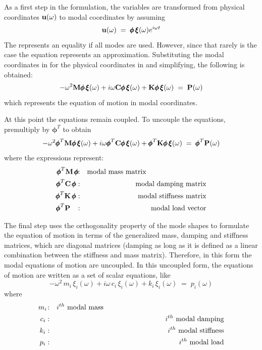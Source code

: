 As a first step in the formulation, the variables are transformed from physical
coordinates ${\bf u}(\omega)$ to modal coordinates by assuming
%
\begin{equation}
\label{eq:fra6}
{\bf u}(\omega) \;=\; {\pmb\phi}\,{\pmb\xi}(\omega)e^{i\omega t}
\end{equation}
%
The  represents an equality if all modes are used.
However, since that rarely is the case the equation represents an approximation.
Substituting the modal coordinates in  for the physical
coordinates in  and simplifying, the following is obtained:
%
\begin{equation}
\label{eq:fra8}
-\omega^2{\bf M}{\pmb\phi}\,{\pmb\xi}(\omega) +
i\omega  {\bf C}{\pmb\phi}\,{\pmb\xi}(\omega) +
         {\bf K}{\pmb\phi}\,{\pmb\xi}(\omega) \;=\; {\bf P}(\omega)
\end{equation}
%
which represents the equation of motion in modal coordinates.

At this point the equations remain coupled.
To uncouple the equations, premultiply by ${\pmb\phi}^T$ to obtain
%
\begin{equation}
\label{eq:fra9}
-\omega^2{\pmb\phi}^T{\bf M}{\pmb\phi}\,{\pmb\xi}(\omega) +
  i\omega{\pmb\phi}^T{\bf C}{\pmb\phi}\,{\pmb\xi}(\omega) +
         {\pmb\phi}^T{\bf K}{\pmb\phi}\,{\pmb\xi}(\omega) \;=\;
         {\pmb\phi}^T{\bf P}(\omega)
\end{equation}
%
where the expressions represent:
%
\begin{eqnarray*}
{\pmb\phi}^T{\mf M}\,{\pmb\phi}\!\! &:& \mbox{modal mass matrix\hskip3cm} \\
{\pmb\phi}^T{\mf C}\,{\pmb\phi} &:& \mbox{modal damping matrix} \\
{\pmb\phi}^T{\mf K}\,{\pmb\phi} &:& \mbox{modal stiffness matrix} \\
{\pmb\phi}^T{\mf P}\;\;\;       &:& \mbox{modal load vector}
\end{eqnarray*}

The final step uses the orthogonality property of the mode shapes to
formulate the equation of motion in terms of the generalized mass, damping and
stiffness matrices, which are diagonal matrices (damping as long as it is
defined as a linear combination between the stiffness and mass matrix).
Therefore, in this form the modal equations of motion are uncoupled.
In this uncoupled form, the equations of motion are written as a set of
scalar equations, like
%
\begin{equation}
\label{eq:fra10}
-\omega^2\,m_i\,{\xi_i}(\omega) +
i\omega  \,c_i\,{\xi_i}(\omega) +
           k_i\,{\xi_i}(\omega) \;=\; p_i(\omega)
\end{equation}
%
where
%
\begin{eqnarray*}
m_i\! &:& i^{th}\mbox{ modal mass\hskip6cm} \\
c_i &:& i^{th}\mbox{ modal damping} \\
k_i &:& i^{th}\mbox{ modal stiffness} \\
p_i &:& i^{th}\mbox{ modal load}
\end{eqnarray*}

